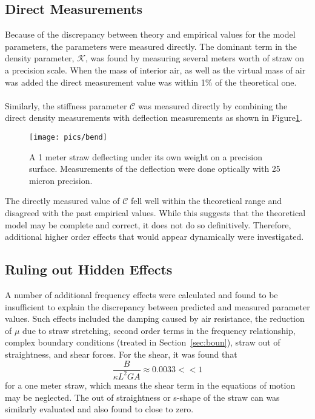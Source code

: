 \documentclass[twoside]{article}
\begin{document}
\begin{multicols}{2}
\subsection{Direct  Measurements}
Because of the discrepancy between theory and empirical values for the model parameters, the parameters were measured directly. The dominant term in the density parameter, $\mathcal{K}$, was found by measuring several meters worth of straw on a precision scale. When the mass of interior air, as well as the virtual mass of air was added the direct measurement value was within 1\% of the theoretical one. \\
\\
Similarly, the stiffness parameter $\mathcal{C}$ was measured directly by combining the direct density measurements with deflection measurements as shown in Figure\ref{fig:bend}.

\begin{figure}[H]
	\texttt{[image: pics/bend]}
	\caption{A 1 meter straw deflecting under its own weight on a precision surface. Measurements of the deflection were done optically with 25 micron precision.}
	\label{fig:bend}
\end{figure}
The directly measured value of $\mathcal{C}$ fell well within the theoretical range and disagreed with the past empirical values. While this suggests that the theoretical model may be complete and correct, it does not do so definitively. Therefore, additional higher order effects that would appear dynamically were investigated.



\subsection{Ruling out Hidden Effects}
A number of additional frequency effects were calculated and found to be insufficient to explain the discrepancy between predicted and measured parameter values. Such effects included the damping caused by air resistance, the reduction of $\mu$ due to straw stretching, second order terms in the frequency relationship, complex boundary conditions (treated in Section~\ref{sec:boun}), straw out of straightness, and shear forces. For the shear, it was found that
\begin{equation}
\frac{B}{\kappa L^2 G A}\approx 0.0033 << 1
\end{equation}
for a one meter straw, which means the shear term in the equations of motion may be neglected. The out of straightness or s-shape of the straw can was similarly evaluated and also found to close to zero. 



\end{multicols}
\end{document}
